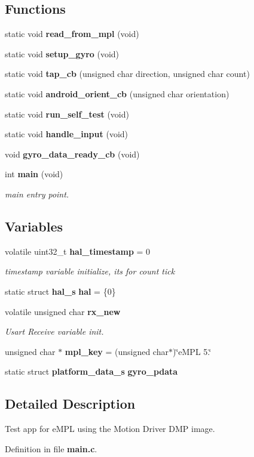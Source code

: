 \subsection*{Functions}
\begin{DoxyCompactItemize}
\item 
static void \textbf{ read\+\_\+from\+\_\+mpl} (void)
\item 
static void \textbf{ setup\+\_\+gyro} (void)
\item 
static void \textbf{ tap\+\_\+cb} (unsigned char direction, unsigned char count)
\item 
static void \textbf{ android\+\_\+orient\+\_\+cb} (unsigned char orientation)
\item 
static void \textbf{ run\+\_\+self\+\_\+test} (void)
\item 
static void \textbf{ handle\+\_\+input} (void)
\item 
void \textbf{ gyro\+\_\+data\+\_\+ready\+\_\+cb} (void)
\item 
int \textbf{ main} (void)
\begin{DoxyCompactList}\small\item\em main entry point. \end{DoxyCompactList}\end{DoxyCompactItemize}
\subsection*{Variables}
\begin{DoxyCompactItemize}
\item 
volatile uint32\+\_\+t \textbf{ hal\+\_\+timestamp} = 0
\begin{DoxyCompactList}\small\item\em timestamp variable initialize, its for count tick \end{DoxyCompactList}\item 
static struct \textbf{ hal\+\_\+s} \textbf{ hal} = \{0\}
\item 
volatile unsigned char \textbf{ rx\+\_\+new}
\begin{DoxyCompactList}\small\item\em Usart Receive variable init. \end{DoxyCompactList}\item 
unsigned char $\ast$ \textbf{ mpl\+\_\+key} = (unsigned char$\ast$)\char`\"{}e\+M\+PL 5.\char`\"{}
\item 
static struct \textbf{ platform\+\_\+data\+\_\+s} \textbf{ gyro\+\_\+pdata}
\end{DoxyCompactItemize}


\subsection{Detailed Description}
Test app for e\+M\+PL using the Motion Driver D\+MP image. 



Definition in file \textbf{ main.\+c}.

